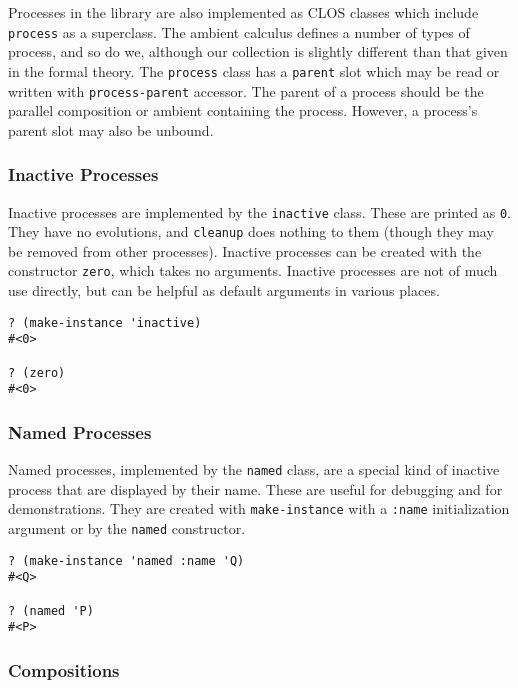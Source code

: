 \documentclass[12pt]{article}
\begin{document}
Processes in the library are also implemented as CLOS classes which include \texttt{process} as a superclass.
The ambient calculus defines a number of types of process, and so do we, although our collection is slightly different than that given in the formal theory.
The \texttt{process} class has a \texttt{parent} slot which may be read or written with \texttt{process-parent} accessor.
The parent of a process should be the parallel composition or ambient containing the process.
However, a process's parent slot may also be unbound.

\subsubsection{Inactive Processes}
\label{sec:inactive-processes}

Inactive processes are implemented by the \texttt{inactive} class.
These are printed as \texttt{0}.
They have no evolutions, and \texttt{cleanup} does nothing to them (though they may be removed from other processes).
Inactive processes can be created with the constructor \texttt{zero}, which takes no arguments.
Inactive processes are not of much use directly, but can be helpful as default arguments in various places.

\begin{verbatim}
? (make-instance 'inactive)
#<0>

? (zero)
#<0>
\end{verbatim}

\subsubsection{Named Processes}
\label{sec:named-processes}

Named processes, implemented by the \texttt{named} class, are a special kind of inactive process that are displayed by their name.
These are useful for debugging and for demonstrations.
They are created with \texttt{make-instance} with a \texttt{:name} initialization argument or by the \texttt{named} constructor.

\begin{verbatim}
? (make-instance 'named :name 'Q)
#<Q>

? (named 'P)
#<P>
\end{verbatim}

\subsubsection{Compositions}
\label{sec:compositions}
\end{document}
